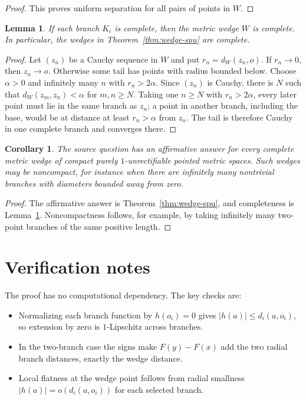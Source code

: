 \documentclass[11pt]{amsart}
\newtheorem{lemma}{Lemma}
\newtheorem{corollary}{Corollary}
\begin{document}
\begin{proof}
This proves uniform separation for all pairs of points in $W$.
\end{proof}

\begin{lemma}
\label{lem:complete}
If each branch $K_i$ is complete, then the metric wedge $W$ is complete.  In
particular, the wedges in Theorem~\ref{thm:wedge-spu} are complete.
\end{lemma}

\begin{proof}
Let $(z_n)$ be a Cauchy sequence in $W$ and put $r_n=d_W(z_n,o)$.  If
$r_n\to 0$, then $z_n\to o$.  Otherwise some tail has points with radius
bounded below.  Choose $\alpha>0$ and infinitely many $n$ with $r_n>2\alpha$.
Since $(z_n)$ is Cauchy, there is $N$ such that $d_W(z_m,z_n)<\alpha$ for
$m,n\geq N$.  Taking one $n\geq N$ with $r_n>2\alpha$, every later point must
lie in the same branch as $z_n$; a point in another branch, including the base,
would be at distance at least $r_n>\alpha$ from $z_n$.  The tail is therefore
Cauchy in one complete branch and converges there.
\end{proof}

\begin{corollary}
The source question has an affirmative answer for every complete metric wedge
of compact purely $1$-unrectifiable pointed metric spaces.  Such wedges may be
noncompact, for instance when there are infinitely many nontrivial branches
with diameters bounded away from zero.
\end{corollary}

\begin{proof}
The affirmative answer is Theorem~\ref{thm:wedge-spu}, and completeness is
Lemma~\ref{lem:complete}.  Noncompactness follows, for example, by taking
infinitely many two-point branches of the same positive length.
\end{proof}

\section*{Verification notes}

The proof has no computational dependency.  The key checks are:
\begin{itemize}[leftmargin=*]
\item Normalizing each branch function by $h(o_i)=0$ gives
  $|h(a)|\leq d_i(a,o_i)$, so extension by zero is $1$-Lipschitz across
  branches.
\item In the two-branch case the signs make
  $F(y)-F(x)$ add the two radial branch distances, exactly the wedge distance.
\item Local flatness at the wedge point follows from radial smallness
  $|h(a)|=o(d_i(a,o_i))$ for each selected branch.
\end{itemize}
\end{document}
